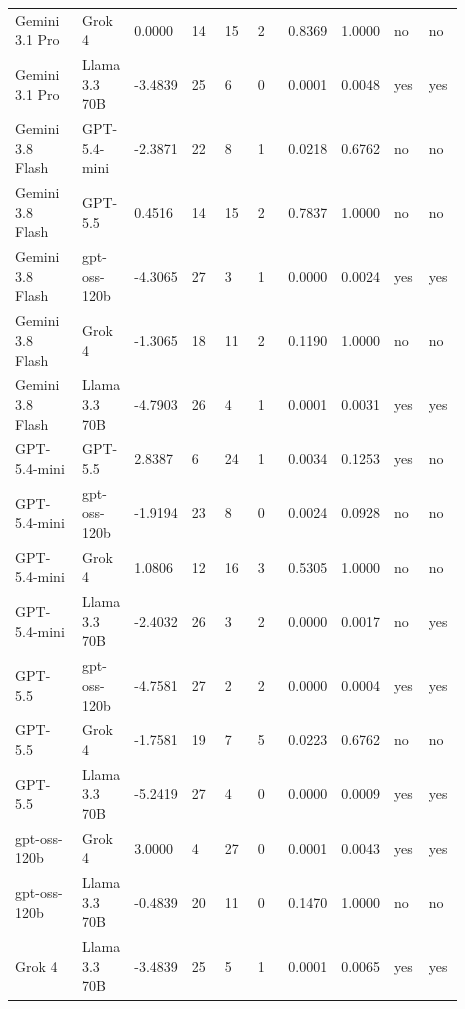 \begin{landscape}
\begin{longtable}{p{0.162\linewidth}p{0.081\linewidth}p{0.081\linewidth}p{0.081\linewidth}p{0.081\linewidth}p{0.081\linewidth}p{0.081\linewidth}p{0.081\linewidth}p{0.081\linewidth}p{0.081\linewidth}}
Gemini 3.1 Pro & Grok 4 & 0.0000 & 14 & 15 & 2 & 0.8369 & 1.0000 & no & no \\
Gemini 3.1 Pro & Llama 3.3 70B & -3.4839 & 25 & 6 & 0 & 0.0001 & 0.0048 & yes & yes \\
Gemini 3.8 Flash & GPT-5.4-mini & -2.3871 & 22 & 8 & 1 & 0.0218 & 0.6762 & no & no \\
Gemini 3.8 Flash & GPT-5.5 & 0.4516 & 14 & 15 & 2 & 0.7837 & 1.0000 & no & no \\
Gemini 3.8 Flash & gpt-oss-120b & -4.3065 & 27 & 3 & 1 & 0.0000 & 0.0024 & yes & yes \\
Gemini 3.8 Flash & Grok 4 & -1.3065 & 18 & 11 & 2 & 0.1190 & 1.0000 & no & no \\
Gemini 3.8 Flash & Llama 3.3 70B & -4.7903 & 26 & 4 & 1 & 0.0001 & 0.0031 & yes & yes \\
GPT-5.4-mini & GPT-5.5 & 2.8387 & 6 & 24 & 1 & 0.0034 & 0.1253 & yes & no \\
GPT-5.4-mini & gpt-oss-120b & -1.9194 & 23 & 8 & 0 & 0.0024 & 0.0928 & no & no \\
GPT-5.4-mini & Grok 4 & 1.0806 & 12 & 16 & 3 & 0.5305 & 1.0000 & no & no \\
GPT-5.4-mini & Llama 3.3 70B & -2.4032 & 26 & 3 & 2 & 0.0000 & 0.0017 & no & yes \\
GPT-5.5 & gpt-oss-120b & -4.7581 & 27 & 2 & 2 & 0.0000 & 0.0004 & yes & yes \\
GPT-5.5 & Grok 4 & -1.7581 & 19 & 7 & 5 & 0.0223 & 0.6762 & no & no \\
GPT-5.5 & Llama 3.3 70B & -5.2419 & 27 & 4 & 0 & 0.0000 & 0.0009 & yes & yes \\
gpt-oss-120b & Grok 4 & 3.0000 & 4 & 27 & 0 & 0.0001 & 0.0043 & yes & yes \\
gpt-oss-120b & Llama 3.3 70B & -0.4839 & 20 & 11 & 0 & 0.1470 & 1.0000 & no & no \\
Grok 4 & Llama 3.3 70B & -3.4839 & 25 & 5 & 1 & 0.0001 & 0.0065 & yes & yes \\
\bottomrule
\end{longtable}
\normalsize
\end{landscape}
